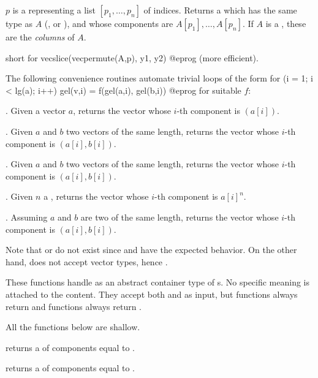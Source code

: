  $p$ is a  representing
a list $[p_1,\dots,p_n]$ of indices. Returns a  which has the same
type as $A$ (,  or ), and whose components
are $A[p_1],\dots,A[p_n]$. If $A$ is a , these are the
\emph{columns} of $A$.

 short for
\bprog
  vecslice(vecpermute(A,p), y1, y2)
@eprog\noindent
(more efficient).


The following convenience routines automate trivial loops of the form
\bprog
  for (i = 1; i < lg(a); i++) gel(v,i) = f(gel(a,i), gel(b,i))
@eprog\noindent
for suitable $f$:

. Given a vector $a$,
returns the vector whose $i$-th component is $(a[i])$.

. Given $a$ and $b$ two vectors of the same
length, returns the vector whose $i$-th component is $(a[i], b[i])$.

. Given $a$ and $b$ two vectors of the same
length, returns the vector whose $i$-th component is $(a[i], b[i])$.

. Given $n$ a , returns
the vector whose $i$-th component is $a[i]^n$.

. Assuming $a$ and $b$ are two 
of the same length, returns the vector whose $i$-th component
is $(a[i], b[i])$.

Note that  or  do not exist since 
and  have the expected behavior. On the other hand,
 does not accept vector types, hence .


These functions handle  as an abstract container type of
s. No specific meaning is attached to the content. They accept both
 and  as input, but  functions always return
 and  functions always return .

 All the functions below are shallow.

 returns a  of  components
equal to .

 returns a  of  components
equal to .

